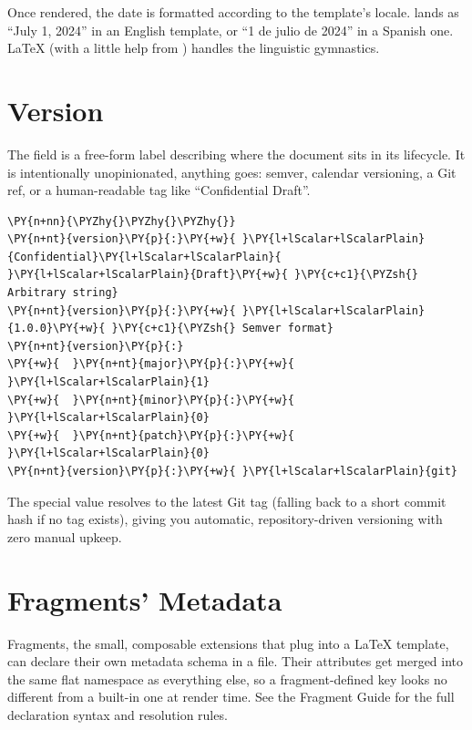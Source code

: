\documentclass[a4paper,twoside]{article}
\begin{document}
Once rendered, the date is formatted according to the template's locale.  lands as \enquote{July 1, 2024} in an English template, or \enquote{1 de julio de 2024} in a Spanish one. \LaTeX{} (with a little help from ) handles the linguistic gymnastics.
\section{Version}
The  field is a free-form label describing where the document sits in its lifecycle. It is intentionally unopinionated, anything goes: semver, calendar versioning, a Git ref, or a human-readable tag like \enquote{Confidential Draft}.
\begin{tscode}[lang=yaml, engine=pygments]
\begin{Verbatim}[commandchars=\\\{\},breaklines, breakanywhere, commandchars=\\\{\}]
\PY{n+nn}{\PYZhy{}\PYZhy{}\PYZhy{}}
\PY{n+nt}{version}\PY{p}{:}\PY{+w}{ }\PY{l+lScalar+lScalarPlain}{Confidential}\PY{l+lScalar+lScalarPlain}{ }\PY{l+lScalar+lScalarPlain}{Draft}\PY{+w}{ }\PY{c+c1}{\PYZsh{} Arbitrary string}
\PY{n+nt}{version}\PY{p}{:}\PY{+w}{ }\PY{l+lScalar+lScalarPlain}{1.0.0}\PY{+w}{ }\PY{c+c1}{\PYZsh{} Semver format}
\PY{n+nt}{version}\PY{p}{:}
\PY{+w}{  }\PY{n+nt}{major}\PY{p}{:}\PY{+w}{ }\PY{l+lScalar+lScalarPlain}{1}
\PY{+w}{  }\PY{n+nt}{minor}\PY{p}{:}\PY{+w}{ }\PY{l+lScalar+lScalarPlain}{0}
\PY{+w}{  }\PY{n+nt}{patch}\PY{p}{:}\PY{+w}{ }\PY{l+lScalar+lScalarPlain}{0}
\PY{n+nt}{version}\PY{p}{:}\PY{+w}{ }\PY{l+lScalar+lScalarPlain}{git}
\end{Verbatim}
\end{tscode}
The special  value resolves to the latest Git tag (falling back to a short commit hash if no tag exists), giving you automatic, repository-driven versioning with zero manual upkeep.
\section{Fragments' Metadata}
Fragments, the small, composable extensions that plug into a \LaTeX{} template, can declare their own metadata schema in a  file. Their attributes get merged into the same flat namespace as everything else, so a fragment-defined key looks no different from a built-in one at render time. See the Fragment Guide for the full declaration syntax and resolution rules.
\end{document}
